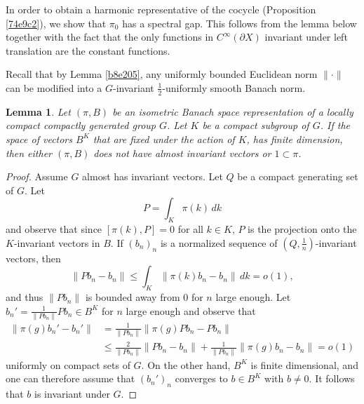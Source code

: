 \documentclass[12pt]{amsart}
\newtheorem{lemma}[theorem]{Lemma}
\theoremstyle{definition}
\begin{document}
In order to obtain a harmonic representative of the cocycle (Proposition
\ref{74e9c2}), we show that \(\pi_{0}\) has a spectral gap. This follows
from the lemma below together with the fact that the only functions in
\(C^{\infty}(\partial X)\) invariant under left translation are the
constant functions.

Recall that by Lemma \ref{b8e205}, any uniformly bounded Euclidean norm
\(\|\cdot\|\) can be modified into a \(G\)-invariant
\(\frac{1}{2}\)-uniformly smooth Banach norm.


\begin{lemma}
\label{418062}
Let \((\pi,B)\) be an isometric Banach space representation of a locally
compact compactly generated group \(G\). Let \(K\) be a compact subgroup
of \(G\). If the space of vectors \(B^K\) that are fixed under the
action of \(K\), has finite dimension, then either \((\pi,B)\) does not
have almost invariant vectors or \(1\subset \pi\).
\end{lemma}

\begin{proof}
Assume \(G\) almost has invariant vectors. Let \(Q\) be a compact
generating set of \(G\). Let \[P=\int_K \pi(k)\,dk\] and observe that
since \([\pi(k),P]=0\) for all \(k\in K\), \(P\) is the projection onto
the \(K\)-invariant vectors in \(B\). If \((b_n)_n\) is a normalized
sequence of \(\left( Q, \frac{1}{n} \right)\)-invariant vectors, then
\[\|Pb_n-b_n\|\le\int_K\|\pi(k)b_n-b_n\|\,dk = o(1),\] and thus
\(\|Pb_{n}\|\) is bounded away from \(0\) for \(n\) large enough. Let
\(b_n'=\frac{1}{\|Pb_n\|}Pb_n\in B^K\) for \(n\) large enough and
observe that
\begin{align*}
\|\pi(g)b_n'-b_n'\|
&=\frac{1}{\|Pb_n\|}\|\pi(g)Pb_n-Pb_n\| \\
&\le \frac{2}{\|Pb_n\|}\|Pb_n-b_n\|+\frac{1}{\|Pb_n\|}\|\pi(g)b_n-b_n\|
= o(1)
\end{align*}
uniformly on compact sets of \(G\). On the other hand, \(B^K\) is
finite dimensional, and one can therefore assume that \((b_n')_n\)
converges to \(b\in B^K\) with \(b\neq0\). It follows that \(b\) is
invariant under \(G\).

\end{proof}




\end{document}
